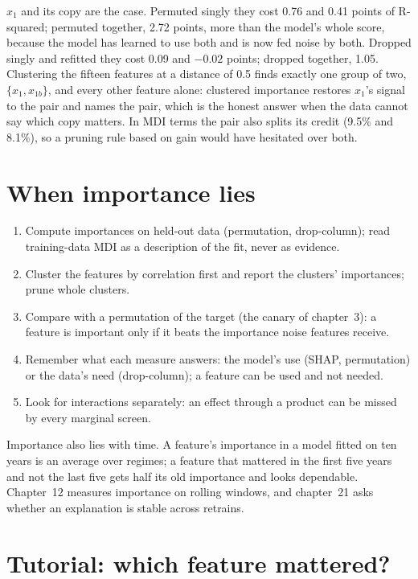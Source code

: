 $x_1$ and its copy are the case. Permuted singly they cost 0.76 and 0.41 points of R-squared; permuted together, 2.72
points, more than the model's whole score, because the model has learned to use both and is now fed noise by both.
Dropped singly and refitted they cost 0.09 and $-0.02$ points; dropped together, 1.05. Clustering the fifteen features
at a distance of 0.5 finds exactly one group of two, $\{x_1, x_{1b}\}$, and every other feature alone: clustered
importance restores $x_1$'s signal to the pair and names the pair, which is the honest answer when the data cannot say
which copy matters. In MDI terms the pair also splits its credit (9.5\% and 8.1\%), so a pruning rule based on gain would
have hesitated over both.

\section{When importance lies}

\begin{method}\label{met:ml:importance:reading}
\begin{enumerate}
\item Compute importances on held-out data (permutation, drop-column); read training-data MDI as a description of the
fit, never as evidence.
\item Cluster the features by correlation first and report the clusters' importances; prune whole clusters.
\item Compare with a permutation of the target (the canary of chapter~3): a feature is important only if it beats the
importance noise features receive.
\item Remember what each measure answers: the model's use (SHAP, permutation) or the data's need (drop-column); a
feature can be used and not needed.
\item Look for interactions separately: an effect through a product can be missed by every marginal screen.
\end{enumerate}
\end{method}

Importance also lies with time. A feature's importance in a model fitted on ten years is an average over regimes; a
feature that mattered in the first five years and not the last five gets half its old importance and looks
dependable. Chapter~12 measures importance on rolling windows, and chapter~21 asks whether an explanation is stable
across retrains.

\section{Tutorial: which feature mattered?}\label{tut:ml:feature-engineering-selection-and-importance:tut}

